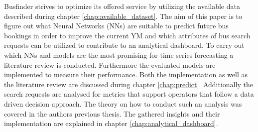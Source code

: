 \newline
\newline
Busfinder strives to optimize its offered service by utilizing the available data described during chapter \ref{chap:available_dataset}. The aim of this paper is to figure out what Neural Networks (NNs) are suitable to predict future bus bookings in order to improve the current YM and which attributes of bus search requests can be utilized to contribute to an analytical dashboard. To carry out which NNs and models are the most promising for time series forecasting a literature review is conducted. Furthermore the evaluated models are implemented to measure their performance. Both the implementation as well as the literature review are discussed during chapter \ref{chap:predict}. Additionally the search requests are analysed for metrics that support operators that follow a data driven decision approach. The theory on how to conduct such an analysis was covered in the authors previous thesis. The gathered insights and their implementation are explained in chapter \ref{chap:analytical_dashboard}.


